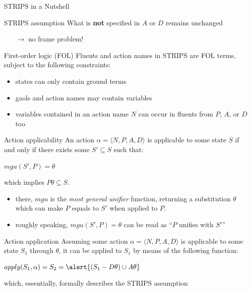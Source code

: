 \documentclass[presentation]{beamer}\mode<presentation>{\usetheme{AMSBolognaFC}}
\begin{document}
\begin{frame}[allowframebreaks]{STRIPS in a Nutshell}
\begin{alertblock}{STRIPS assumption}
	What is \textbf{not} specified in $A$ or $D$ remains unchanged
	\begin{itemize}
		\item[$\rightarrow$] no frame problem!
	\end{itemize}
\end{alertblock}

\begin{block}{First-order logic (FOL)}
	Fluents and action names in STRIPS are FOL \alert{terms}, subject to the following constraints:
	\begin{itemize}
		\item states can only contain \alert{ground} terms
		\item gaols and action names may contain \alert{variables}
		\item variables contained in an action name $N$ can occur in fluents from $P$, $A$, or $D$ too
	\end{itemize}
\end{block}

\framebreak

\begin{block}{Action applicability}
	An action $\alpha = \langle N, P, A, D \rangle$ is \alert{applicable} to some state $S$ if and only if there exists some $S' \subseteq S$ such that:
	\begin{center}
		$mgu(S', P) = \theta$
	\end{center}
	which implies $P \theta \subseteq S$.
\end{block}
%
\begin{itemize}
	\item there, $mgu$ is the \emph{most general unifier} function, returning a substitution $\theta$ which can make $P$ equals to $S'$ when applied to $P$.
	\item roughly speaking, $mgu(S', P) = \theta$ can be read as ``$P$ unifies with $S'$''
\end{itemize}

\begin{block}{Action application}
	Assuming some action $\alpha = \langle N, P, A, D \rangle$ is applicable to some state $S_1$ through $\theta$, it can be applied to $S_1$ by means of the following function:
	\begin{center}
	 	$apply(S_1, \alpha) = S_2 = \alert{(S_1 - D \theta) \cup A \theta} $
	\end{center}
	which, essentially, formally describes the STRIPS assumption
\end{block}

\end{frame}
\end{document}
